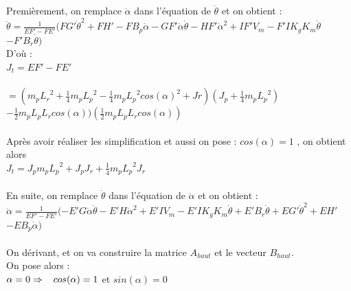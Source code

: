 \documentclass[12pt, a4paper, openany]{report}
\begin{document}
 Premièrement, on remplace $\ddot{\alpha}$ dans l'équation de $\ddot{\theta}$ et on obtient :\\ 


$\ddot{\theta}=\frac{1}{E{F}'-F{E}'}(F{G}'\dot{\theta}^2+F{H}'-FB_{p}\dot{\alpha}-G{F}'\dot{\alpha}\dot{\theta}-H{F}'\dot{\alpha}^2+I{F}'V_{m}-{F}'IK_{g}K_{m}\dot{\theta}$\\$-{F}'B_{r}\dot{\theta})$\\ 

D'où :\\

$J_{t} = E{F}'-F{E}'$\\\\ $=(m_{p}{L_{r}}^2+\frac{1}{4}m_{p}{L_{p}}^2-\frac{1}{4}m_{p}{L_{p}}^2cos({\alpha})^2+Jr)(J_{p}+\frac{1}{4}m_{p}{L_{p}}^2)$\\
$-\frac{1}{2}m_{p}L_{p}L_{r}cos(\alpha))(\frac{1}{2}m_{p}L_{p}L_{r}cos(\alpha))$\\\\


Après avoir réaliser les simplification et aussi on pose :  $cos(\alpha)=1$ , on obtient alors \\


     $J_{t}=J_{p}m_{p}{L_{p}}^2+J_{p}J_{r}+\frac{1}{4}m_{p}{L_{p}}^2J_{r}$\\\\


 En suite, on remplace $\ddot{\theta}$ dans l'équation de $\ddot{\alpha}$ et on obtient :\\

    $\ddot{\alpha}=\frac{1}{E{F}'-F{E}'}(-{E}'G\dot{\alpha}\dot{\theta}-{E}'H\dot{\alpha}^2+{E}'IV_{m}-{E}'IK_{g}K_{m}\dot{\theta}+{E}'B_{r}\dot{\theta}+E{G}'\dot{\theta}^2+E{H}'$\\$-EB_{p}\dot{\alpha})$\\\\


On dérivant, et on va construire la matrice $A_{haut}$ et le vecteur $B_{haut}$.\\
On pose alors :\\

$\alpha = 0 \Rightarrow \hspace{3mm} cos(\alpha) = 1$ et $sin(\alpha) = 0$ 
\end{document}
